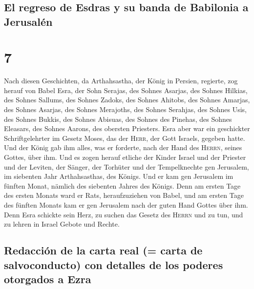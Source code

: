 \hypertarget{el-regreso-de-esdras-y-su-banda-de-babilonia-a-jerusaluxe9n}{%
\subsection{El regreso de Esdras y su banda de Babilonia a
Jerusalén}\label{el-regreso-de-esdras-y-su-banda-de-babilonia-a-jerusaluxe9n}}

\hypertarget{section-6}{%
\section{7}\label{section-6}}

 Nach diesen Geschichten, da Arthahsastha, der König in
Persien, regierte, zog herauf von Babel Esra, der Sohn Serajas, des
Sohnes Asarjas, des Sohnes Hilkias,  des Sohnes Sallums,
des Sohnes Zadoks, des Sohnes Ahitobs,  des Sohnes
Amarjas, des Sohnes Asarjas, des Sohnes Merajoths,  des
Sohnes Serahjas, des Sohnes Usis, des Sohnes Bukkis,  des
Sohnes Abisuas, des Sohnes des Pinehas, des Sohnes Eleasars, des Sohnes
Aarons, des obersten Priesters.  Esra aber war ein
geschickter Schriftgelehrter im Gesetz Moses, das der \textsc{Herr}, der
Gott Israels, gegeben hatte. Und der König gab ihm alles, was er
forderte, nach der Hand des \textsc{Herrn}, seines Gottes, über ihm.
 Und es zogen herauf etliche der Kinder Israel und der
Priester und der Leviten, der Sänger, der Torhüter und der Tempelknechte
gen Jerusalem, im siebenten Jahr Arthahsasthas, des Königs.
 Und er kam gen Jerusalem im fünften Monat, nämlich des
siebenten Jahres des Königs.  Denn am ersten Tage des
ersten Monats ward er Rats, heraufzuziehen von Babel, und am ersten Tage
des fünften Monats kam er gen Jerusalem nach der guten Hand Gottes über
ihm.  Denn Esra schickte sein Herz, zu suchen das Gesetz
des \textsc{Herrn} und zu tun, und zu lehren in Israel Gebote und
Rechte.

\hypertarget{redacciuxf3n-de-la-carta-real-carta-de-salvoconducto-con-detalles-de-los-poderes-otorgados-a-ezra}{%
\subsection{Redacción de la carta real (= carta de salvoconducto) con
detalles de los poderes otorgados a
Ezra}\label{redacciuxf3n-de-la-carta-real-carta-de-salvoconducto-con-detalles-de-los-poderes-otorgados-a-ezra}}

